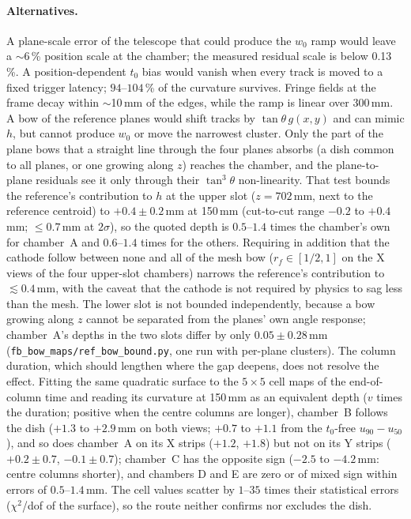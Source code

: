 \paragraph{Alternatives.}
A plane-scale error of the telescope that could produce the $w_0$ ramp would leave a $\sim$6\,\% position scale at the
chamber; the measured residual scale is below 0.13\,\%. A position-dependent $t_0$ bias would vanish when every track is
moved to a fixed trigger latency; $94$--$104$\,\% of the curvature survives. Fringe fields at the frame decay within
$\sim$10\,mm of the edges, while the ramp is linear over 300\,mm. A bow of the reference planes would shift tracks by
$\tan\theta\, g(x,y)$ and can mimic $h$, but cannot produce $w_0$ or move the narrowest cluster. Only the part of the
plane bows that a straight line through the four planes absorbs (a dish common to all planes, or one growing along $z$)
reaches the chamber, and the plane-to-plane residuals see it only through their $\tan^3\theta$ non-linearity. That test
bounds the reference's contribution to $h$ at the upper slot ($z=702$\,mm, next to the reference centroid) to
$+0.4\pm0.2$\,mm at 150\,mm (cut-to-cut range $-0.2$ to $+0.4$\,mm; $\le0.7$\,mm at $2\sigma$), so the quoted depth is
$0.5$--$1.4$ times the chamber's own for chamber~A and $0.6$--$1.4$ times for the others. Requiring in addition that the
cathode follow between none and all of the mesh bow ($r_f\in[1/2,1]$ on the X views of the four upper-slot chambers) narrows
the reference's contribution to $\lesssim0.4$\,mm, with the caveat that the cathode is not required by physics to sag less
than the mesh. The lower slot is not bounded independently, because a bow growing along $z$ cannot be separated from the
planes' own angle response; chamber~A's depths in the two slots differ by only $0.05\pm0.28$\,mm
(\texttt{fb\_bow\_maps/ref\_bow\_bound.py}, one run with per-plane clusters).
The column duration, which should lengthen where the gap deepens, does not resolve the effect. Fitting the same quadratic surface to the
$5\times5$ cell maps of the end-of-column time and reading its curvature at 150\,mm as an equivalent depth ($v$ times the duration; positive when the
centre columns are longer), chamber~B follows the dish ($+1.3$ to $+2.9$\,mm on both views; $+0.7$ to $+1.1$ from the $t_0$-free
$u_{90}-u_{50}$), and so does chamber~A on its X strips ($+1.2$, $+1.8$) but not on its Y strips ($+0.2\pm0.7$, $-0.1\pm0.7$); chamber~C has the
opposite sign ($-2.5$ to $-4.2$\,mm: centre columns shorter), and chambers D and E are zero or of mixed sign within errors of $0.5$--$1.4$\,mm. The cell values scatter by
$1$--$35$ times their statistical errors ($\chi^2$/dof of the surface), so the route neither confirms nor excludes the dish.

